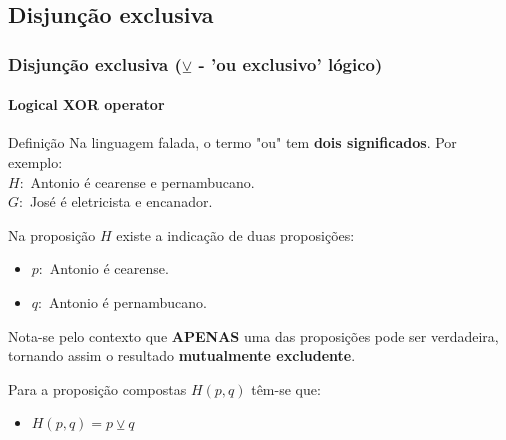 \subsection{Disjunção exclusiva}
%
\begin{frame}[t]
    \frametitle{Disjunção exclusiva ($\veebar$ - 'ou exclusivo' lógico)}
    \framesubtitle{Logical XOR operator}
    \begin{block}{Definição}
        Na linguagem falada, o termo "ou" tem \textbf{dois significados}. Por exemplo:\\ [2pt]
        $H:$ Antonio é cearense e pernambucano. \\[2pt]
        $G:$ José é eletricista e encanador.
    \end{block}
    \vspace{-2mm}
    \pause
    \begin{block}{}
        Na proposição $H$ existe a indicação de duas proposições:
        \begin{itemize}
            \item[] $p:$ Antonio é cearense.
            \item[] $q:$ Antonio é pernambucano.
        \end{itemize}
        Nota-se pelo contexto que \textbf{APENAS} uma das proposições pode ser verdadeira, tornando assim o resultado \textbf{mutualmente excludente}.
    \end{block}
    \vspace{-2mm}
    \pause
    \begin{block}{}
        Para a proposição compostas $H(p,q)$ têm-se que:
        \begin{itemize}
            \item $H(p,q) = p \veebar q$
        \end{itemize}
    \end{block}
\end{frame}
%
